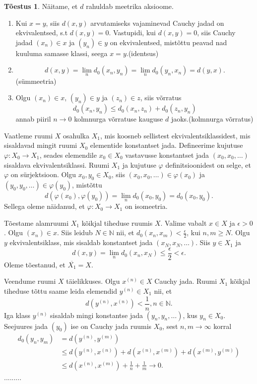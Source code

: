 \documentclass{article}[12pt]
\newcommand{\N}{\mathbb{N}}
\theoremstyle{definition}
\theoremstyle{definition}
\theoremstyle{definition}
\theoremstyle{break}
\newtheorem*{toestus}{Tõestus}
\begin{document}
\begin{toestus}
	Näitame, et $d$ rahuldab meetrika aksioome.
	\begin{enumerate}
		\item Kui $x=y$, siis $d(x,y)$ arvutamiseks vajaminevad Cauchy jadad on ekvivalentsed, s.t $d(x,y) = 0$.
		Vastupidi, kui $d(x,y)=0$, siis Cauchy jadad $(x_n)\in x$ ja $(y_n)\in y$ on ekvivalentsed, mistõttu peavad nad kuuluma samasse klassi, seega $x=y$.\hfill (identsus)
		\item 
		\[
			d(x,y) = \lim_n d_0(x_n,y_n) = \lim_n d_0(y_n,x_n) = d(y,x).
		\]
		\hfill (sümmeetria)
		\item Olgu $(x_n)\in x$, $(y_n)\in y$ ja $(z_n)\in z$, siis võrratus
		\[
			d_0(x_n,y_n) \leq d_0(x_n,z_n) + d_0(z_n,y_n)
		\]
		annab piiril $n\rightarrow 0$ kolmnurga võrratuse kauguse $d$ jaoks.\hfill (kolmnurga võrratus)
	\end{enumerate}
	
	Vaatleme ruumi $X$ osahulka $X_1$, mis koosneb sellistest ekvivalentsiklassidest, mis sisaldavad mingit ruumi $X_0$ elementide konstantset jada.
	Defineerime kujutuse $\varphi:X_0\rightarrow X_1$, seades elemendile $x_0\in X_0$ vastavusse konstantset jada $(x_0,x_0,\dots)$ sisaldava ekvivalentsiklassi.
	Ruumi $X_1$ ja kujutuse $\varphi$ definitsioonidest on selge, et $\varphi$ on sürjektsioon. Olgu $x_0,y_0\in X_0$, siis $(x_0,x_0,\dots)\in\varphi(x_0)$ ja $(y_0,y_0,\dots)\in\varphi(y_0)$, mistõttu
	\[
		d(\varphi(x_0),\varphi(y_0)) = \lim_n d_0(x_0,y_0) = d_0(x_0,y_0).
	\]
	Sellega oleme näidanud, et $\varphi: X_0\rightarrow X_1$ on isomeetria.

	Tõestame alamruumi $X_1$ kõikjal tiheduse ruumis $X$. Valime vabalt $x\in X$ ja $\epsilon > 0$. Olgu $(x_n)\in x$. Siis leidub $N\in\N$ nii, et $d_0(x_n,x_m) < \frac{\epsilon}{2}$, kui $n,m \geq N$. Olgu $y$ ekvivalentsiklass, mis sisaldab konstantset jada $(x_N,x_N,\dots)$. Siis $y\in X_1$ ja
	\[
		d(x,y) = \lim_n d_0(x_n,x_N) \leq \frac{\epsilon}{2} < \epsilon.
	\]
	Oleme tõestanud, et $\overline{X_1} = X$.

	Veendume ruumi $X$ täielikkuses.
	Olgu $x^{(n)}\in X$ Cauchy jada. Ruumi $X_1$ kõikjal tiheduse tõttu saame leida elemendid $y^{(n)}\in X_1$ nii, et
	\[
		d(y^{(n)}, x^{(n)}) < \frac{1}{n},n\in\N.
	\]
	Iga klass $y^{(n)}$ sisaldab mingi konstantse jada $(y_n,y_n,\dots)$, kus $y_n\in X_0$. Seejuures jada $(y_0)$ ise on Cauchy jada ruumis $X_0$, sest $n,m\rightarrow\infty$ korral
	\begin{align*}
		d_0(y_n,y_m) &= d(y^{(n)}, y^{(m)}) \\
		&\leq d(y^{(n)}, x^{(n)}) + d(x^{(n)}, x^{(m)}) + d(x^{(m)}, y^{(m)}) \\
		&\leq d(x^{(n)}, x^{(m)}) + \frac{1}{n} + \frac{1}{m} \rightarrow 0.
	\end{align*}
	.........

\end{toestus}
\end{document}

